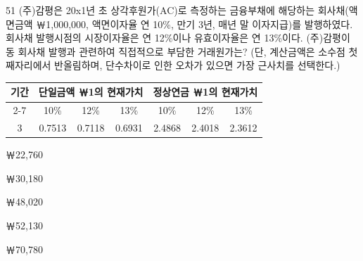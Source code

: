 \begin{question}{51}
(주)감평은 20x1년 초 상각후원가(AC)로 측정하는 금융부채에 해당하는 회사채(액면금액 ￦1,000,000, 액면이자율 연 10\%, 만기 3년, 매년 말 이자지급)를 발행하였다. 회사채 발행시점의 시장이자율은 연 12\%이나 유효이자율은 연 13\%이다. (주)감평이 동 회사채 발행과 관련하여 직접적으로 부담한 거래원가는? (단, 계산금액은 소수점 첫째자리에서 반올림하며, 단수차이로 인한 오차가 있으면 가장 근사치를 선택한다.)
\par{\small\centering\begin{tabular}{|c|c|c|c|c|c|c|}\hline
\multirow{2}{*}{기간} & \multicolumn{3}{c|}{단일금액 ￦1의 현재가치} & \multicolumn{3}{c|}{정상연금 ￦1의 현재가치} \\ \cline{2-7}
 & 10\% & 12\% & 13\% & 10\% & 12\% & 13\% \\ \hline
3 & 0.7513 & 0.7118 & 0.6931 & 2.4868 & 2.4018 & 2.3612 \\ \hline
\end{tabular}\par}
\begin{choices}
  \item ￦22,760
  \item ￦30,180
  \item ￦48,020
  \item ￦52,130
  \item ￦70,780
\end{choices}
\end{question}
